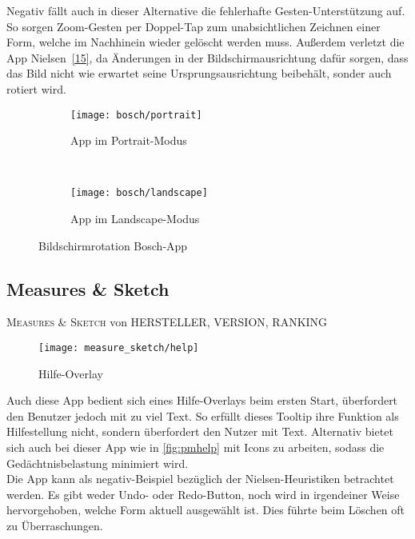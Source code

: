 Negativ fällt auch in dieser Alternative die fehlerhafte Gesten-Unterstützung auf. So sorgen Zoom-Gesten per Doppel-Tap zum unabsichtlichen Zeichnen einer Form, welche im Nachhinein wieder gelöscht werden muss. Außerdem verletzt die App Nielsen~\ref{15}, da Änderungen in der Bildschirmausrichtung dafür sorgen, dass das Bild nicht wie erwartet seine Ursprungsausrichtung beibehält, sonder auch rotiert wird. 

\begin{figure}[h]
	\begin{subfigure}[b]{0.5\textwidth}
		\texttt{[image: bosch/portrait]}
		\caption{App im Portrait-Modus}
		\label{fig:bportait}	
	\end{subfigure}
	~
	\begin{subfigure}[b]{0.5\textwidth}
		\texttt{[image: bosch/landscape]}
		\caption{App im Landscape-Modus}
		\label{fig:blandscape}	
	\end{subfigure}
	\caption{Bildschirmrotation Bosch-App}
	\label{fig:borientation}
\end{figure}

\subsection{Measures \& Sketch}

\textsc{Measures \& Sketch} von HERSTELLER, VERSION, RANKING \\

\begin{wrapfigure}{R}{0.4\textwidth}
	\texttt{[image: measure\_sketch/help]}
	\caption{Hilfe-Overlay}
	\label{fig:mshelp}
\end{wrapfigure}

Auch diese App bedient sich eines Hilfe-Overlays beim ersten Start, überfordert den Benutzer jedoch mit zu viel Text. So erfüllt dieses Tooltip ihre Funktion als Hilfestellung nicht, sondern überfordert den Nutzer mit Text. Alternativ bietet sich auch bei dieser App wie in \autoref{fig:pmhelp} mit Icons zu arbeiten, sodass die Gedächtnisbelastung minimiert wird. \\

Die App kann als negativ-Beispiel bezüglich der Nielsen-Heuristiken betrachtet werden. Es gibt weder Undo- oder Redo-Button, noch wird in irgendeiner Weise hervorgehoben, welche Form aktuell ausgewählt ist. Dies führte beim Löschen oft zu Überraschungen. \\

